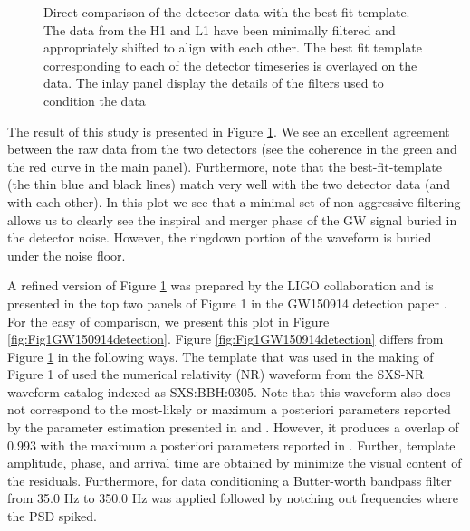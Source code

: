 \begin{figure}
\caption{Direct comparison of the detector data with the best fit template. The data from the H1 and L1 have been minimally filtered and  appropriately shifted to align with each other. The best fit template corresponding to each of the detector timeseries is overlayed on the data. The inlay panel display the details of the filters used to condition the data}
\label{fig:overlayGW150914}
\end{figure}

The result of this study is presented in Figure \ref{fig:overlayGW150914}. We see an excellent agreement between the raw data from the two detectors (see the coherence in the green and the red curve in the main panel). Furthermore, note that the best-fit-template (the thin blue and black lines) match very well with the two detector data (and with each other). In this plot we see that a minimal set of non-aggressive filtering allows us to clearly see the inspiral and merger phase of the GW signal buried in the detector noise. However, the ringdown portion of the waveform is buried under the noise floor. 

A refined version of Figure \ref{fig:overlayGW150914} was prepared by the LIGO collaboration and is presented in the top two panels of Figure 1 in the GW150914 detection paper \cite{gw150914detection}. For the easy of comparison, we present this plot in Figure \ref{fig:Fig1GW150914detection}. Figure \ref{fig:Fig1GW150914detection} differs from Figure \ref{fig:overlayGW150914} in the following ways. The template that was used in the making of Figure 1 of \cite{gw150914detection} used the numerical relativity (NR) waveform from the SXS-NR waveform catalog indexed as SXS:BBH:0305. Note that this waveform also does not correspond to the most-likely or  maximum a posteriori parameters reported by the parameter estimation presented in \cite{gw150914PE} and  \cite{gw150914PEseobnrv3}. However, it produces a overlap of 0.993 with the maximum a posteriori parameters reported in \cite{gw150914PEseobnrv3}. Further, template amplitude, phase, and arrival time are obtained by minimize the visual content of the residuals. Furthermore, for data conditioning a Butter-worth bandpass filter from 35.0 Hz to 350.0 Hz was applied followed by notching out frequencies where the PSD spiked. 


